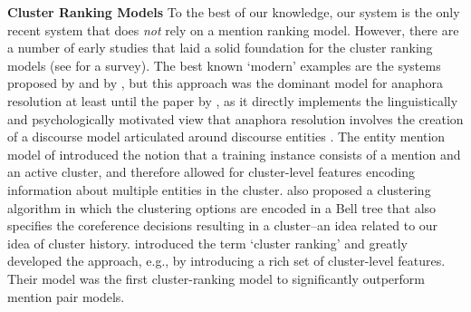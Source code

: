 \documentclass[10pt, a4paper]{article}
\begin{document}
\textbf{Cluster Ranking Models} To the best of our knowledge, our system is the only recent system that does \textit{not} rely on a mention ranking model. 
However, there are a number of early studies that laid a solid foundation for the cluster ranking models (see \cite{poesio-et-al:ana_book_heuristic} for a survey).
The best known `modern' examples are the systems proposed by  and by , 
but this approach 
was the dominant model for anaphora resolution at least until the paper by , as it directly implements the linguistically and psychologically motivated view that anaphora resolution involves the creation of a discourse model articulated around discourse entities \cite{karttunen:76}. 
The entity mention model of  introduced the notion that a training instance consists of a mention and an active cluster, and therefore allowed for cluster-level features encoding information about multiple entities in the cluster. 
 also proposed a clustering algorithm in which the clustering options are encoded in a Bell tree that also specifies the coreference decisions resulting in a cluster--an idea related to our idea of cluster history.
 introduced the term `cluster ranking' and greatly developed the approach, e.g., by introducing a rich set of cluster-level features.
Their model was the first cluster-ranking model to significantly outperform mention pair models. 
\end{document}
